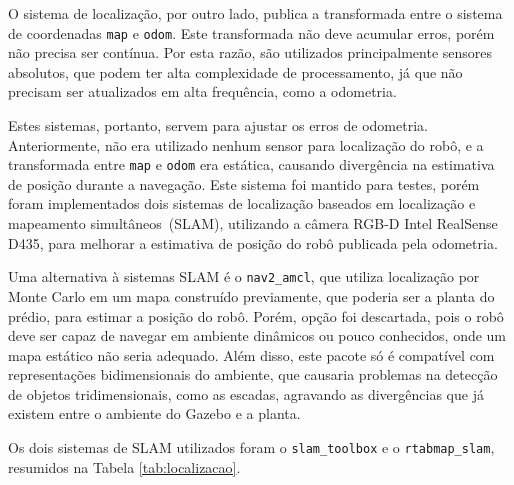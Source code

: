 \documentclass[repeatfields,xlists,xpacks,oneside,yearsonly]{ufrgscca}
\begin{document}
O sistema de localização, por outro lado, publica a transformada
entre o sistema de coordenadas \texttt{map} e \texttt{odom}. Este
transformada não deve acumular erros, porém não precisa ser contínua.
Por esta razão, são utilizados principalmente sensores absolutos, que
podem ter alta complexidade de processamento, já que não precisam ser
atualizados em alta frequência, como a odometria.

Estes sistemas, portanto, servem para ajustar os erros de odometria.
Anteriormente, não era utilizado nenhum sensor para localização do
robô, e a transformada entre \texttt{map} e \texttt{odom} era
estática, causando divergência na estimativa de posição durante a
navegação. Este sistema foi mantido para testes, porém foram
implementados dois sistemas de localização baseados em localização e
mapeamento simultâneos~(SLAM), utilizando a câmera RGB-D Intel
RealSense D435, para melhorar a estimativa de posição do robô
publicada pela odometria.

Uma alternativa à sistemas SLAM é o \texttt{nav2\_amcl}, que utiliza
localização por Monte Carlo em um mapa construído previamente, que
poderia ser a planta do prédio, para estimar a posição do robô.
Porém, opção foi descartada, pois o robô deve ser capaz de navegar em
ambiente dinâmicos ou pouco conhecidos, onde um mapa estático não
seria adequado. Além disso, este pacote só é compatível com
representações bidimensionais do ambiente, que causaria problemas na
detecção de objetos tridimensionais, como as escadas, agravando as
divergências que já existem entre o ambiente do Gazebo e a planta.

Os dois sistemas de SLAM utilizados foram o \texttt{slam\_toolbox} e
o \texttt{rtabmap\_slam}, resumidos na Tabela \ref{tab:localizacao}.
\end{document}
